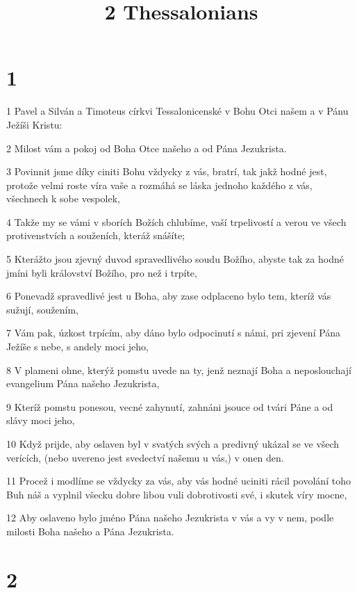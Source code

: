 

\title{2 Thessalonians}

\chapter{1}

\par 1 Pavel a Silván a Timoteus církvi Tessalonicenské v Bohu Otci našem a v Pánu Ježíši Kristu:
\par 2 Milost vám a pokoj od Boha Otce našeho a od Pána Jezukrista.
\par 3 Povinnit jsme díky ciniti Bohu vždycky z vás, bratrí, tak jakž hodné jest, protože velmi roste víra vaše a rozmáhá se láska jednoho každého z vás, všechnech k sobe vespolek,
\par 4 Takže my se vámi v sborích Božích chlubíme, vaší trpelivostí a verou ve všech protivenstvích a souženích, kteráž snášíte;
\par 5 Kterážto jsou zjevný duvod spravedlivého soudu Božího, abyste tak za hodné jmíni byli království Božího, pro než i trpíte,
\par 6 Ponevadž spravedlivé jest u Boha, aby zase odplaceno bylo tem, kteríž vás sužují, soužením,
\par 7 Vám pak, úzkost trpícím, aby dáno bylo odpocinutí s námi, pri zjevení Pána Ježíše s nebe, s andely moci jeho,
\par 8 V plameni ohne, kterýž pomstu uvede na ty, jenž neznají Boha a neposlouchají evangelium Pána našeho Jezukrista,
\par 9 Kteríž pomstu ponesou, vecné zahynutí, zahnáni jsouce od tvári Páne a od slávy moci jeho,
\par 10 Když prijde, aby oslaven byl v svatých svých a predivný ukázal se ve všech verících, (nebo uvereno jest svedectví našemu u vás,) v onen den.
\par 11 Procež i modlíme se vždycky za vás, aby vás hodné uciniti rácil povolání toho Buh náš a vyplnil všecku dobre libou vuli dobrotivosti své, i skutek víry mocne,
\par 12 Aby oslaveno bylo jméno Pána našeho Jezukrista v vás a vy v nem, podle milosti Boha našeho a Pána Jezukrista.

\chapter{2}

